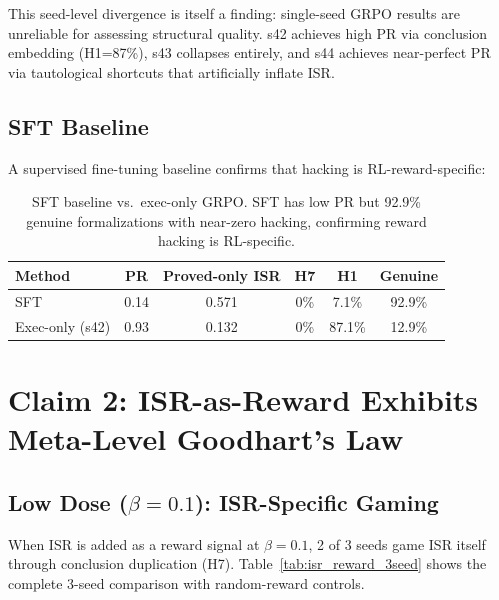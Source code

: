 \documentclass[11pt,a4paper]{article}
\newcommand{\ISR}{\textsc{ISR}}
\newcommand{\GRPO}{\textsc{GRPO}}
\begin{document}
This seed-level divergence is itself a finding: single-seed \GRPO{} results are unreliable for assessing structural quality. s42 achieves high PR via conclusion embedding (H1=87\%), s43 collapses entirely, and s44 achieves near-perfect PR via tautological shortcuts that artificially inflate \ISR{}.

\subsection{SFT Baseline}

A supervised fine-tuning baseline confirms that hacking is RL-reward-specific:

\begin{table}[h]
\centering
\small
\begin{tabular}{lccccc}
\toprule
\textbf{Method} & \textbf{PR} & \textbf{Proved-only \ISR{}} & \textbf{H7} & \textbf{H1} & \textbf{Genuine} \\
\midrule
SFT & 0.14 & 0.571 & 0\% & 7.1\% & 92.9\% \\
Exec-only (s42) & 0.93 & 0.132 & 0\% & 87.1\% & 12.9\% \\
\bottomrule
\end{tabular}
\caption{SFT baseline vs.\ exec-only \GRPO{}. SFT has low PR but 92.9\% genuine formalizations with near-zero hacking, confirming reward hacking is RL-specific.}
\label{tab:sft}
\end{table}

\section{Claim 2: ISR-as-Reward Exhibits Meta-Level Goodhart's Law}
\label{sec:claim2}

\subsection{Low Dose ($\beta{=}0.1$): ISR-Specific Gaming}

When \ISR{} is added as a reward signal at $\beta{=}0.1$, 2 of 3 seeds game \ISR{} itself through conclusion duplication (H7). Table~\ref{tab:isr_reward_3seed} shows the complete 3-seed comparison with random-reward controls.
\end{document}
